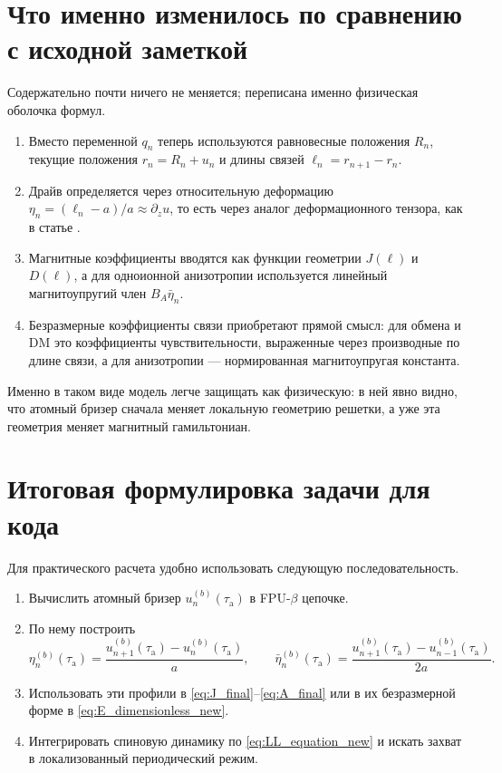 \documentclass[12pt,a4paper]{article}
\newcommand{\ta}{\tau_{\mathrm{a}}}
\begin{document}
\section{Что именно изменилось по сравнению с исходной заметкой}
Содержательно почти ничего не меняется; переписана именно физическая оболочка формул.

\begin{enumerate}
    \item Вместо переменной $q_n$ теперь используются равновесные положения $R_n$, текущие положения $r_n=R_n+u_n$ и длины связей $\ell_n=r_{n+1}-r_n$.
    \item Драйв определяется через относительную деформацию $\eta_n=(\ell_n-a)/a\approx \partial_z u$, то есть через аналог деформационного тензора, как в статье \cite{Tereshchenko2022}.
    \item Магнитные коэффициенты вводятся как функции геометрии $J(\ell)$ и $D(\ell)$, а для одноионной анизотропии используется линейный магнитоупругий член $B_A\bar\eta_n$.
    \item Безразмерные коэффициенты связи приобретают прямой смысл: для обмена и DM это коэффициенты чувствительности, выраженные через производные по длине связи, а для анизотропии --- нормированная магнитоупругая константа.
\end{enumerate}

Именно в таком виде модель легче защищать как физическую: в ней явно видно, что атомный бризер сначала меняет локальную геометрию решетки, а уже эта геометрия меняет магнитный гамильтониан.

\section{Итоговая формулировка задачи для кода}
Для практического расчета удобно использовать следующую последовательность.
\begin{enumerate}
    \item Вычислить атомный бризер $u_n^{(b)}(\ta)$ в FPU-$\beta$ цепочке.
    \item По нему построить
    \begin{equation*}
    \eta_n^{(b)}(\ta)=\frac{u_{n+1}^{(b)}(\ta)-u_n^{(b)}(\ta)}{a},
    \qquad
    \bar\eta_n^{(b)}(\ta)=\frac{u_{n+1}^{(b)}(\ta)-u_{n-1}^{(b)}(\ta)}{2a}.
    \end{equation*}
    \item Использовать эти профили в \eqref{eq:J_final}--\eqref{eq:A_final} или в их безразмерной форме в \eqref{eq:E_dimensionless_new}.
    \item Интегрировать спиновую динамику по \eqref{eq:LL_equation_new} и искать захват в локализованный периодический режим.
\end{enumerate}
\end{document}

